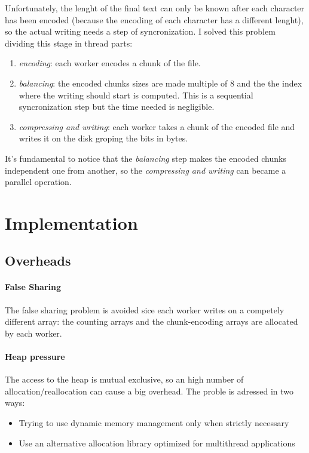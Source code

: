 \documentclass[12pt, letterpaper]{article}  %
\begin{document}
Unfortunately, the lenght of the final text can only be known after each character has been encoded (because the encoding of each character
has a different lenght), so the actual writing needs a step of syncronization. I solved this problem dividing this stage in thread parts:
\begin{enumerate}
    \item \textit{encoding}: each worker encodes a chunk of the file.
    \item \textit{balancing}: the encoded chunks sizes are made multiple of 8 and the the index where the writing should start is computed. This is a sequential syncronization step but the time needed is negligible.
    \item \textit{compressing and writing}: each worker takes a chunk of the encoded file and writes it on the disk groping the bits in bytes.
\end{enumerate}
It's fundamental to notice that the \textit{balancing} step makes the encoded chunks independent one from another, so the \textit{compressing and writing} can became a parallel operation.


\section{Implementation}

\subsection{Overheads}

\paragraph*{False Sharing}
The false sharing problem is avoided sice each worker writes on a competely different array: the counting arrays
and the chunk-encoding arrays are allocated by each worker.

\paragraph*{Heap pressure}
The access to the heap is mutual exclusive, so an high number of allocation/reallocation can cause a big overhead.
The proble is adressed in two ways:
\begin{itemize}
    \item Trying to use dynamic memory management only when strictly necessary
    \item Use an alternative allocation library optimized for multithread applications
\end{itemize}
\end{document}
